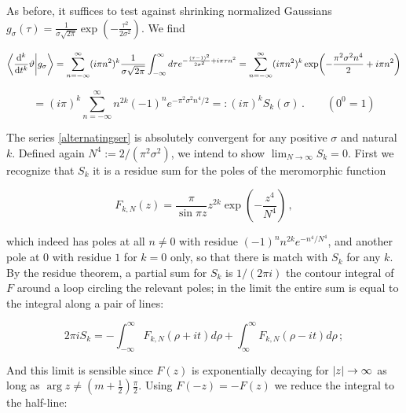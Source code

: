 \documentclass{article}
\newcommand{\intR}{\int_{-\infty}^\infty}
\newcommand{\sumZ}{\sum_{n=-\infty}^{\infty}}
\begin{document}
As before, it suffices to test against shrinking normalized Gaussians $g_\sigma(\tau) = \frac{1}{\sigma\sqrt{2\pi}} \exp( - \frac{\tau^2}{2\sigma^2} )$. We find

\begin{equation}
    \bra{\dv[k]{t}\vartheta}\ket{g_\sigma} = \sumZ (i\pi n^2)^k \frac{1}{\sigma\sqrt{2\pi}} \intR d\tau e^{- \frac{(\tau-1)^2}{2\sigma^2} + i\pi\tau n^2} = \sumZ (i\pi n^2)^k \exp( - \frac{\pi^2 \sigma^2 n^4}{2} + i\pi n^2)
\end{equation}

\begin{equation}\label{alternatingser}
    = (i\pi)^k \sumZ n^{2k} (-1)^n e^{-\pi^2 \sigma^2 n^4/2} =: (i\pi)^k S_k(\sigma)\,.\quad\quad(0^0 = 1)
\end{equation}

The series \eqref{alternatingser} is absolutely convergent for any positive $\sigma$ and natural $k$. Defined again $N^4 := 2/(\pi^2 \sigma^2)$, we intend to show  $\lim_{N \rightarrow \infty} S_k = 0$. First we recognize that $S_k$ it is a residue sum for the poles of the meromorphic function

\begin{equation}
    F_{k,N}(z) = \frac{\pi}{\sin{\pi z}} z^{2k} \exp(-\frac{z^4}{N^4})\,,
\end{equation}



which indeed has poles at all $n \neq 0$ with residue $(-1)^n n^{2k} e^{-n^4/N^4}$, and another pole at $0$ with residue $1$ for $k=0$ only, so that there is match with $S_k$ for any $k$. By the residue theorem, a partial sum for $S_k$ is $1/(2\pi i)$ the contour integral of $F$ around a loop circling the relevant poles; in the limit the entire sum is equal to the integral along a pair of lines:

\begin{equation}
    2\pi i S_k = -\int_{-\infty}^\infty F_{k,N}(\rho + it) d\rho + \int_\infty^\infty F_{k,N}(\rho-it)d\rho\,;
\end{equation}

And this limit is sensible since $F(z)$ is exponentially decaying for $\abs{z} \rightarrow \infty$ as long as $\arg{z} \neq (m+\frac{1}{2}) \frac{\pi}{2}$. Using $F(-z) = - F(z)$ we reduce the integral to the half-line:
\end{document}
